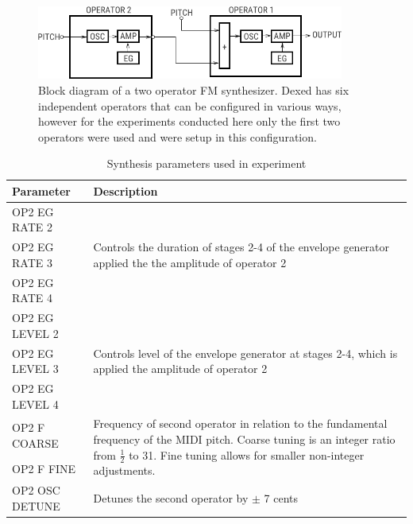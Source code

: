 \begin{figure}[ht]
    \centering
    \includegraphics[width=0.9\textwidth]{figures/spiegelib/two_op_fm_block.png}
    \caption{Block diagram of a two operator FM synthesizer. Dexed has six independent operators that can be configured in various ways, however for the experiments conducted here only the first two operators were used and were setup in this configuration.}
    \label{fig:two_op_fm_block}
\end{figure}

\begin{table}[ht]
\centering
\caption{Synthesis parameters used in experiment}
\label{tbl:dexed-params}
\begin{tabular}{l|l}
\toprule
Parameter     & Description                                                                                  \\
\midrule
OP2 EG RATE 2 & \multirow{3}{*}{\parbox{0.70\linewidth}{Controls the duration of stages 2-4 of the envelope generator applied the the amplitude of operator 2}} \\
OP2 EG RATE 3 \\
OP2 EG RATE 4 \\
\midrule
OP2 EG LEVEL 2 & \multirow{3}{*}{\parbox{0.6\linewidth}{Controls level of the envelope generator at stages 2-4, which is applied the amplitude of operator 2}} \\
OP2 EG LEVEL 3 \\
OP2 EG LEVEL 4 \\
\midrule
OP2 F COARSE & \multirow{2}{*}{\parbox{0.6\linewidth}{Frequency of second operator in relation to the fundamental frequency of the MIDI pitch. Coarse tuning is an integer ratio from $\frac{1}{2}$ to 31. Fine tuning allows for smaller non-integer adjustments.}} \\[2.75ex]
OP2 F FINE \\[2.75ex]
\midrule
OP2 OSC DETUNE & \multirow{1}{*}{\parbox{0.6\linewidth}{Detunes the second operator by $\pm$ 7 cents}}\\
\bottomrule                                                                                        
\end{tabular}
\end{table}
\vspace{1cm}

